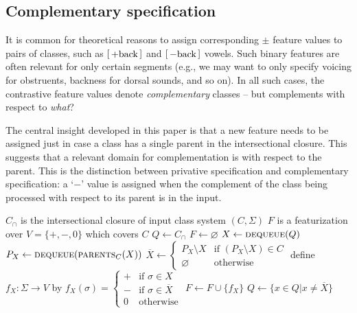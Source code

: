 \documentclass[12pt, oneside]{article}   	%
\newcommand{\featmat}[1]
{$\begin{bsmallmatrix*}[l]\text{\normalsize #1}\end{bsmallmatrix*}$}
\begin{document}
\FloatBarrier
\subsection{Complementary specification}
\label{sec:contrastiveunder}

It is common for theoretical reasons to assign corresponding $\pm$ feature values to pairs of classes, such as \featmat{+back} and \featmat{$-$back} vowels. Such binary features are often relevant for only certain segments (e.g., we may want to only specify voicing for obstruents, backness for dorsal sounds, and so on). In all such cases, the contrastive feature values denote \textit{complementary} classes -- but complements with respect to \textit{what}?  

The central insight developed in this paper is that a new feature needs to be assigned just in case a class has a single parent in the intersectional closure. This suggests that a relevant domain for complementation is with respect to the parent. This is the distinction between privative specification and complementary specification: a `$-$' value is assigned when the complement of the class being processed with respect to its parent is in the input.
\noindent \begin{algorithmic}
	\singlespacing
    \REQUIRE $C_\cap$ is the intersectional closure of input class system $(C, \Sigma)$
    \ENSURE $F$ is a featurization over $V = \{ +, -, 0 \}$ which covers $C$
    \STATE
    \STATE $Q \leftarrow C_\cap$
    \STATE $F \leftarrow \varnothing$
    \STATE
        \STATE $X \leftarrow \textsc{dequeue}(Q)$
            \STATE $P_X \leftarrow \textsc{dequeue}(\textsc{parents}_C(X))$
            \STATE
            \STATE $\overline{X} \leftarrow \begin{cases}
                P_X \setminus X & \text{if } (P_X \setminus X) \in C \\
                \varnothing     & \text{otherwise}
                \end{cases}$
            \STATE
            \STATE define $f_X : \Sigma \rightarrow V$ by $f_X (\sigma) = \begin{cases}
                    + & \text{if } \sigma \in X \\
                    - & \text{if } \sigma \in \overline{X} \\
                    0 & \text{otherwise}
                    \end{cases}$
            \STATE $F \leftarrow F \cup \{f_X\}$
            \STATE $Q \leftarrow \{x \in Q \vert x \neq \overline{X} \}$
        \ENDIF
    \ENDWHILE
\end{algorithmic}
\doublespacing
\end{document}
